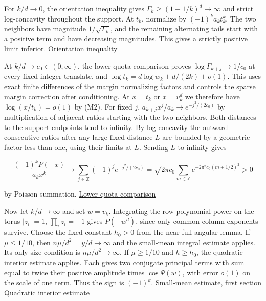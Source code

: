 For $k/d\to0$, the orientation inequality gives $\Gamma_k\ge(1+1/k)^d\to\infty$ and strict log-concavity throughout the support. At $t_k$, normalize by $(-1)^ka_kt_k^k$. The two neighbors have magnitude $1/\sqrt{\Gamma_k}$, and the remaining alternating tails start with a positive term and have decreasing magnitudes. This gives a strictly positive limit inferior. \href{https://github.com/ProgramComputer/open-math-research/blob/04564a728c21eab6ce511b98a48ccaac754648ff/topics/balanced-arrays/orientation-normalization.md}{Orientation inequality}

At $k/d\to c_0\in(0,\infty)$, the lower-quota comparison proves $\log\Gamma_{k+j}\to1/c_0$ at every fixed integer translate, and $\log t_k=d\log w_k+d/(2k)+o(1)$. This uses exact finite differences of the margin normalizing factors and controls the sparse margin correction after conditioning. At $x=t_k$ or $x=v_k^d$ we therefore have $\log(x/t_k)=o(1)$ by (M2). For fixed $j$, $a_{k+j}x^j/a_k\to e^{-j^2/(2c_0)}$ by multiplication of adjacent ratios starting with the two neighbors. Both distances to the support endpoints tend to infinity. By log-concavity the outward consecutive ratios after any large fixed distance $L$ are bounded by a geometric factor less than one, using their limits at $L$. Sending $L$ to infinity gives

\begin{equation*}
\frac{(-1)^kP(-x)}{a_k x^k}\longrightarrow
\sum_{j\in\mathbb Z}(-1)^j e^{-j^2/(2c_0)}
=\sqrt{2\pi c_0}\sum_{m\in\mathbb Z}e^{-2\pi^2 c_0(m+1/2)^2}>0
\end{equation*}

by Poisson summation. \hyperref[sec:quadratic-lower-quota]{Lower-quota comparison}

Now let $k/d\to\infty$ and set $w=v_k$. Integrating the row polynomial power on the torus $|z_i|=1$, $\prod_i z_i=-1$ gives $P(-w^d)$, since only common column exponents survive. Choose the fixed constant $h_0>0$ from the near-full angular lemma. If $\mu\le1/10$, then $n\mu/d^2=y/d\to\infty$ and the small-mean integral estimate applies. Its only size condition is $n\mu/d^2\to\infty$. If $\mu\ge1/10$ and $h\ge h_0$, the quadratic interior estimate applies. Each gives two conjugate principal terms with sum equal to twice their positive amplitude times $\cos\Psi(w)$, with error $o(1)$ on the scale of one term. Thus the sign is $(-1)^k$. \href{https://github.com/ProgramComputer/open-math-research/blob/04564a728c21eab6ce511b98a48ccaac754648ff/topics/balanced-arrays/very-tall/very-tall-nearly-empty.md}{Small-mean estimate, first section} \enspace \hyperref[sec:quadratic-interior-saddle]{Quadratic interior estimate}

